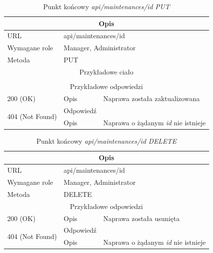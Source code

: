 \documentclass[eng,printmode,openany]{mgr}
\begin{document}
	\begin{table}[H]
		\caption{Punkt końcowy \textit{api/maintenances/id PUT}}
		\begin{tabularx}{\textwidth}{|l|l|X|}
			\hline
			\multicolumn{3}{|c|}{Opis}                         						                \\ \hline
			URL                       & \multicolumn{2}{l|}{api/maintenances/id} 	                \\ \hline
			Wymagane role             & \multicolumn{2}{l|}{Manager, Administrator}                 \\ \hline	
			Metoda                    & \multicolumn{2}{l|}{PUT} 					                \\ \hline
			\multicolumn{3}{|c|}{Przykładowe ciało}         						                \\ \hline
			\multicolumn{3}{|c|}{} 	\\ \hline
			\multicolumn{3}{|c|}{Przykładowe odpowiedzi}                   		                    \\ \hline
			200 (OK)			& Opis         	& Naprawa została zaktualizowana									                    \\ \hline
			\multirow{2}{*}{404 (Not Found)} 	& Odpowiedź     &      \\ \cline{2-3} 
			& Opis          & Naprawa o żądanym \textit{id} nie istnieje  							                \\ \hline
		\end{tabularx}
	\end{table}
	
	\begin{table}[H]
		\caption{Punkt końcowy \textit{api/maintenances/id DELETE}}
		\begin{tabularx}{\textwidth}{|l|l|X|}
			\hline
			\multicolumn{3}{|c|}{Opis}                         						\\ \hline
			URL                       & \multicolumn{2}{l|}{api/maintenances/id} 	\\ \hline
			Wymagane role             & \multicolumn{2}{l|}{Manager, Administrator} \\ \hline
			Metoda                    & \multicolumn{2}{l|}{DELETE} 				\\ \hline
			\multicolumn{3}{|c|}{ Przykładowe odpowiedzi}                   		\\ \hline
			200 (OK)			& Opis         	& Naprawa została usunięta	        \\ \hline
			\multirow{2}{*}{404 (Not Found)} 	& Odpowiedź     &    \\ \cline{2-3} 
			& Opis          & Naprawa o żądanym \textit{id} nie istnieje  							         		 \\ \hline		
		\end{tabularx}
	\end{table}
	
\end{document}
